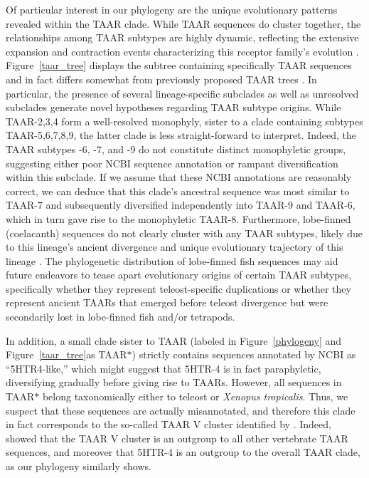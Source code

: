 \documentclass[fleqn,10pt]{wlpeerj}
\begin{document}
Of particular interest in our phylogeny are the unique evolutionary patterns revealed within the TAAR clade. While TAAR sequences do cluster together, the relationships among TAAR subtypes are highly dynamic, reflecting the extensive expansion and contraction events characterizing this receptor family's evolution \citep{Lindemann2005,Hashiguchi2007,Staubert2010,Staubert2013}. Figure~\ref{taar_tree} displays the subtree containing specifically TAAR sequences and in fact differs somewhat from previously proposed TAAR trees \citep{Lindemann2005, Hashiguchi2007}. In particular, the presence of several lineage-specific subclades as well as unresolved subclades generate novel hypotheses regarding TAAR subtype origins. While TAAR-2,3,4 form a well-resolved monophyly, sister to a clade containing subtypes TAAR-5,6,7,8,9, the latter clade is less straight-forward to interpret. Indeed, the TAAR subtypes -6, -7, and -9 do not constitute distinct monophyletic groups, suggesting either poor NCBI sequence annotation or rampant diversification within this subclade. If we assume that these NCBI annotations are reasonably correct, we can deduce that this clade's ancestral sequence was most similar to TAAR-7 and subsequently diversified independently into TAAR-9 and TAAR-6, which in turn gave rise to the monophyletic TAAR-8. Furthermore, lobe-finned (coelacanth) sequences do not clearly cluster with any TAAR subtypes, likely due to this lineage's ancient divergence and unique evolutionary trajectory of this lineage \citep{coelacanth2013}. The phylogenetic distribution of lobe-finned fish sequences may aid future endeavors to tease apart evolutionary origins of certain TAAR subtypes, specifically whether they represent teleost-specific duplications \citep{Gloriametal2005} or whether they represent ancient TAARs that emerged before teleost divergence but were secondarily lost in lobe-finned fish and/or tetrapods.

In addition, a small clade sister to TAAR (labeled in Figure~\ref{phylogeny} and Figure~\ref{taar_tree}as TAAR$\ast$) strictly contains sequences annotated by NCBI as ``5HTR4-like,'' which might suggest that 5HTR-4 is in fact paraphyletic, diversifying gradually before giving rise to TAARs. However, all sequences in TAAR$\ast$ belong taxonomically either to teleost or \emph{Xenopus tropicalis}. Thus, we suspect that these sequences are actually misannotated, and therefore this clade in fact corresponds to the so-called TAAR V cluster identified by \cite{Hashiguchi2007}. Indeed, \cite{Hashiguchi2007} showed that the TAAR V cluster is an outgroup to all other vertebrate TAAR sequences, and moreover that 5HTR-4 is an outgroup to the overall TAAR clade, as our phylogeny similarly shows.
\end{document}

